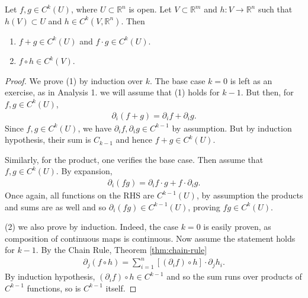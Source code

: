 \begin{prop}\label{prop:Ck-conservation}
	Let $f,g \in C^{k}(U)$, where $U \subset \mathbb{R}^{n}$ is open. Let $V \subset \mathbb{R}^{m}$ and $h: V \to \mathbb{R}^{n}$ such that $h(V) \subset U$ and $h \in C^{k}(V, \mathbb{R}^{n})$.
	Then
	\begin{enumerate}
		\item $f+g \in C^{k}(U)$ and $f \cdot g \in C^{k}(U)$.
		\item $f \circ h \in C^{k}(V)$.
	\end{enumerate}
\end{prop}
\begin{proof}
	We prove (1) by induction over $k$. The base case $k = 0$ is left as an exercise, as in Analysis 1. we will assume that (1) holds for $k-1$. But then, for $f,g \in C^{k}(U)$,
	\begin{align*}
		\partial_{i}(f+g) = \partial_{i}f + \partial_{i}g.
	\end{align*}
	Since $f,g \in C^{k}(U)$, we have $\partial_{i} f, \partial_{i} g \in C^{k-1}$ by assumption. But by induction hypothesis, their sum is $C_{k-1}$ and hence $f+g \in C^{k}(U)$.

	Similarly, for the product, one verifies the base case. Then assume that $f,g \in C^{k}(U)$. By expansion,
	\begin{align*}
		\partial_{i}(fg) = \partial_{i}f \cdot g + f \cdot \partial_{i} g.
	\end{align*}
	Once again, all functions on the RHS are $C^{k-1}(U)$, by assumption the products and sums are as well and so $\partial_{i}(fg) \in C^{k-1}(U)$, proving $fg \in C^{k}(U)$.

	(2) we also prove by induction. Indeed, the case $k=0$ is easily proven, as composition of continuous maps is continuous. Now assume the statement holds for $k-1$. By the Chain Rule, Theorem \ref{thm:chain-rule}
	\begin{align*}
		\partial_{j}(f \circ h) = \sum_{i=1}^{n} [(\partial_{i} f) \circ h] \cdot \partial_{j} h_{i}.
	\end{align*}
	By induction hypothesis, $(\partial_{i} f) \circ h \in C^{k-1}$ and so the sum runs over products of $C^{k-1}$ functions, so is $C^{k-1}$ itself.
\end{proof}


